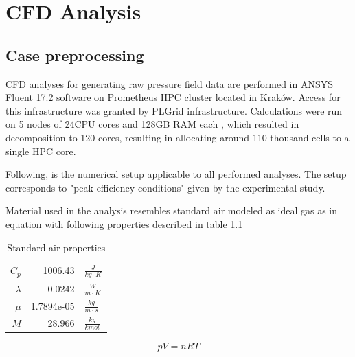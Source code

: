
\chapter{CFD Analysis} %

\label{cfd} %


\section{Case preprocessing} \label{casepre}

CFD analyses for generating raw pressure field data are performed in ANSYS Fluent 17.2 software on Prometheus HPC cluster located in Kraków. Access for this infrastructure was granted by PLGrid infrastructure. Calculations were run on 5 nodes of 24CPU cores and 128GB RAM each \citep{prometheus}, which resulted in decomposition to 120 cores, resulting in allocating around 110 thousand cells to a single HPC core.

Following, is the numerical setup applicable to all performed analyses. The setup corresponds to "peak efficiency conditions" given by the experimental study.

Material used in the analysis resembles standard air modeled as ideal gas as in equation with following properties described in table \ref{tab:stdair} 

\begin{table}[htb!]
\centering
\caption{Standard air properties} \label{tab:stdair}
\begin{tabular}{ r r l }
$C_p$ & 1006.43 & $\frac{J}{kg \cdot K}$ \\
$\lambda$ & 0.0242 & $\frac{W}{m \cdot K}$ \\
$\mu$ & 1.7894e-05 & $\frac{kg}{m \cdot s}$ \\
$M$ & 28.966 & $\frac{kg}{kmol}$ \\
\end{tabular}
\end{table}

\begin{equation} \label{eq:stadair}
p V = n R T
\end{equation}

